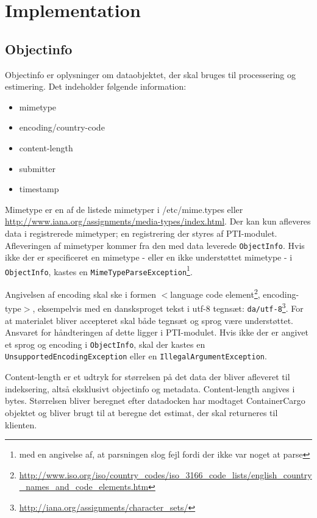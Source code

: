 \documentclass{article}
\begin{document}
\section{Implementation}
\label{sec:implementation}

\subsection{Objectinfo}
Objectinfo er oplysninger om dataobjektet, der skal bruges til
processering og estimering.
Det indeholder følgende information:
\begin{itemize}
\item mimetype
\item encoding/country-code
\item content-length
\item submitter
\item timestamp
\end{itemize}

Mimetype er en af de listede mimetyper i /etc/mime.types eller
\url{http://www.iana.org/assignments/media-types/index.html}. Der kan
kun afleveres data i registrerede mimetyper; en registrering der
styres af PTI-modulet. Afleveringen af mimetyper kommer fra den med
data leverede \texttt{ObjectInfo}. Hvis ikke der er specificeret en mimetype -
eller en ikke understøttet mimetype - i \texttt{ObjectInfo}, kastes en
\texttt{MimeTypeParseException}\footnote{med en angivelse af, at
  parsningen slog fejl fordi der ikke var noget at parse}.

Angivelsen af encoding skal ske i formen $<$language code
element\footnote{\url{http://www.iso.org/iso/country_codes/iso_3166_code_lists/english_country_names_and_code_elements.htm}},
encoding-type$>$, eksempelvis med en dansksproget tekst i utf-8
tegnsæt:
\texttt{da/utf-8}\footnote{\url{http://iana.org/assignments/character_sets/}}. For
at materialet bliver accepteret skal både tegnsæt og sprog være
understøttet. Ansvaret for håndteringen af dette ligger i
PTI-modulet. Hvis ikke der er angivet et sprog og encoding i
\texttt{ObjectInfo}, skal der kastes en
\texttt{UnsupportedEncodingException} eller en
\texttt{IllegalArgumentException}.

Content-length er et udtryk for størrelsen på det data der bliver
afleveret til indeksering, altså eksklusivt objectinfo og
metadata. Content-length angives i bytes. Størrelsen bliver beregnet
efter datadocken har modtaget ContainerCargo objektet og bliver brugt
til at beregne det estimat, der skal returneres til klienten.
\end{document}
